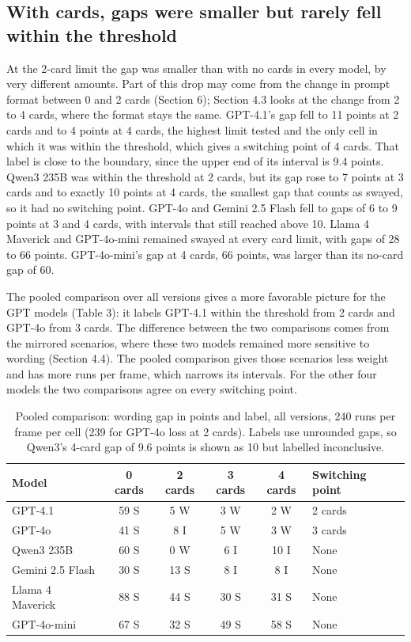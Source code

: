 \documentclass[11pt]{article}
\begin{document}
\subsection{With cards, gaps were smaller but rarely fell within the threshold}

At the 2-card limit the gap was smaller than with no cards in every model, by very different amounts. Part of this drop may come from the change in prompt format between 0 and 2 cards (Section 6); Section 4.3 looks at the change from 2 to 4 cards, where the format stays the same. GPT-4.1's gap fell to 11 points at 2 cards and to 4 points at 4 cards, the highest limit tested and the only cell in which it was within the threshold, which gives a switching point of 4 cards. That label is close to the boundary, since the upper end of its interval is 9.4 points. Qwen3 235B was within the threshold at 2 cards, but its gap rose to 7 points at 3 cards and to exactly 10 points at 4 cards, the smallest gap that counts as swayed, so it had no switching point. GPT-4o and Gemini 2.5 Flash fell to gaps of 6 to 9 points at 3 and 4 cards, with intervals that still reached above 10. Llama 4 Maverick and GPT-4o-mini remained swayed at every card limit, with gaps of 28 to 66 points. GPT-4o-mini's gap at 4 cards, 66 points, was larger than its no-card gap of 60.

The pooled comparison over all versions gives a more favorable picture for the GPT models (Table 3): it labels GPT-4.1 within the threshold from 2 cards and GPT-4o from 3 cards. The difference between the two comparisons comes from the mirrored scenarios, where these two models remained more sensitive to wording (Section 4.4). The pooled comparison gives those scenarios less weight and has more runs per frame, which narrows its intervals. For the other four models the two comparisons agree on every switching point.

\begin{table}[ht]
\centering
\footnotesize
\caption{Pooled comparison: wording gap in points and label, all versions, 240 runs per frame per cell (239 for GPT-4o loss at 2 cards). Labels use unrounded gaps, so Qwen3's 4-card gap of 9.6 points is shown as 10 but labelled inconclusive.}
\label{tab:3}
\setlength{\tabcolsep}{4pt}
\begin{tabular}{lccccl}
\toprule
Model & 0 cards & 2 cards & 3 cards & 4 cards & Switching point \\
\midrule
GPT-4.1 & 59 S & 5 W & 3 W & 2 W & 2 cards \\
GPT-4o & 41 S & 8 I & 5 W & 3 W & 3 cards \\
Qwen3 235B & 60 S & 0 W & 6 I & 10 I & None \\
Gemini 2.5 Flash & 30 S & 13 S & 8 I & 8 I & None \\
Llama 4 Maverick & 88 S & 44 S & 30 S & 31 S & None \\
GPT-4o-mini & 67 S & 32 S & 49 S & 58 S & None \\
\bottomrule
\end{tabular}
\end{table}
\end{document}
